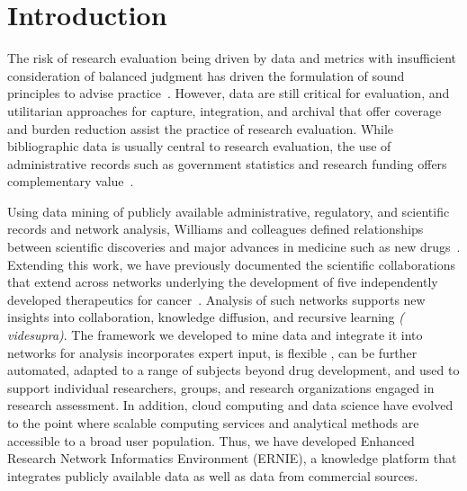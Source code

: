 \documentclass[review]{elsarticle}
\begin{document}
\linenumbers
\raggedright

\section*{Introduction}

The risk of research evaluation being driven by data and metrics with insufficient consideration of balanced judgment has driven the formulation of  sound principles to advise practice~\cite{LeidenManifesto2015}. However, data are still critical for evaluation, and utilitarian approaches for capture, integration, and archival that offer coverage and burden reduction assist the practice of research evaluation. While bibliographic data is usually central to research evaluation, the use of administrative records such as government statistics and research funding offers complementary value~\cite{FedStat2017}.

Using data mining of publicly available administrative, regulatory, and scientific records and network analysis, Williams and colleagues defined relationships between scientific discoveries and major advances in medicine such as new drugs~\cite{Williams2015}. Extending this work, we have previously documented the scientific collaborations that extend across networks underlying the development of five independently developed therapeutics for cancer~\cite{Keserci2017}. Analysis of such networks supports new insights into collaboration, knowledge diffusion, and recursive learning \textit{( videsupra)}. The framework we developed to mine data and integrate it into networks for analysis incorporates expert input, is flexible , can be further automated, adapted to a range of subjects beyond drug development, and used to support individual researchers, groups, and research organizations engaged in research assessment. In addition, cloud computing and data science have evolved to the point where scalable computing services and analytical methods are accessible to a broad user population. Thus, we have developed Enhanced Research Network Informatics Environment (ERNIE), a knowledge platform that integrates publicly available data as well as data from commercial sources.
\end{document}
